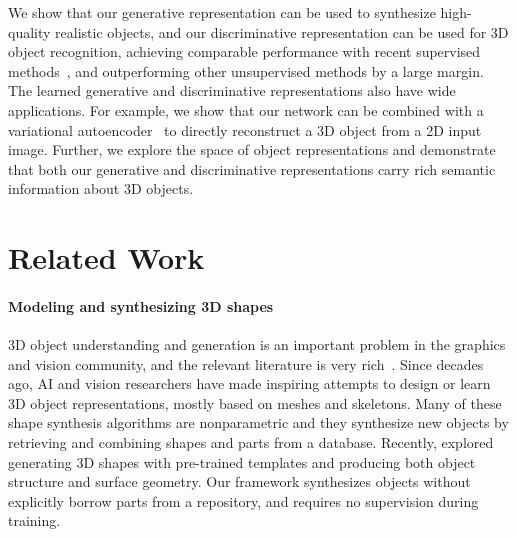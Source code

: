 \documentclass{article}
\newcommand{\presection}{\vspace{-8pt}}
\newcommand{\postsection}{\vspace{-8pt}}
\begin{document}
We show that our generative representation can be used to synthesize high-quality realistic objects, and our discriminative representation can be used for 3D object recognition, achieving comparable performance with recent supervised methods~\citep{maturana2015voxnet,shi2015deeppano}, and outperforming other unsupervised methods by a large margin. The learned generative and discriminative representations also have wide applications. For example, we show that our network can be combined with a variational autoencoder~\citep{kingma2014auto,larsen2015autoencoding} to directly reconstruct a 3D object from a 2D input image. Further, we explore the space of object representations and demonstrate that both our generative and discriminative representations carry rich semantic information about 3D objects. 

\presection
\section{Related Work}
\label{sec:related_work}
\postsection

\paragraph{Modeling and synthesizing 3D shapes}
3D object understanding and generation is an important problem in the graphics and vision community, and the relevant literature is very rich~\citep{carlson1982algorithm,tangelder2008survey,van2011survey,blanz1999morphable,kalogerakis2012probabilistic,chaudhuri2011probabilistic,xue2012example,kar2015category,bansal2016marr,wu2016single}. Since decades ago, AI and vision researchers have made inspiring attempts to design or learn 3D object representations, mostly based on meshes and skeletons. Many of these shape synthesis algorithms are nonparametric and they synthesize new objects by retrieving and combining shapes and parts from a database. Recently, \cite{huang2015analysis} explored generating 3D shapes with pre-trained templates and producing both object structure and surface geometry. Our framework synthesizes objects without explicitly borrow parts from a repository, and requires no supervision during training. %
\end{document}
